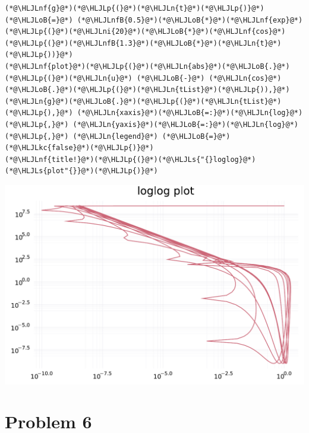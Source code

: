 \documentclass[12pt,a4paper]{article}
\newcommand{\HLJLkc}[1]{\textcolor[RGB]{59,151,46}{\textit{#1}}}
\newcommand{\HLJLn}[1]{#1}
\newcommand{\HLJLnf}[1]{\textcolor[RGB]{66,102,213}{#1}}
\newcommand{\HLJLs}[1]{\textcolor[RGB]{201,61,57}{#1}}
\newcommand{\HLJLnfB}[1]{\textcolor[RGB]{59,151,46}{#1}}
\newcommand{\HLJLni}[1]{\textcolor[RGB]{59,151,46}{#1}}
\newcommand{\HLJLoB}[1]{\textcolor[RGB]{102,102,102}{\textbf{#1}}}
\newcommand{\HLJLp}[1]{#1}
\begin{document}
\begin{lstlisting}
(*@\HLJLnf{g}@*)(*@\HLJLp{(}@*)(*@\HLJLn{t}@*)(*@\HLJLp{)}@*) (*@\HLJLoB{=}@*) (*@\HLJLnfB{0.5}@*)(*@\HLJLoB{*}@*)(*@\HLJLnf{exp}@*)(*@\HLJLp{(}@*)(*@\HLJLni{20}@*)(*@\HLJLoB{*}@*)(*@\HLJLnf{cos}@*)(*@\HLJLp{(}@*)(*@\HLJLnfB{1.3}@*)(*@\HLJLoB{*}@*)(*@\HLJLn{t}@*)(*@\HLJLp{))}@*)
(*@\HLJLnf{plot}@*)(*@\HLJLp{(}@*)(*@\HLJLn{abs}@*)(*@\HLJLoB{.}@*)(*@\HLJLp{(}@*)(*@\HLJLn{u}@*) (*@\HLJLoB{-}@*) (*@\HLJLn{cos}@*)(*@\HLJLoB{.}@*)(*@\HLJLp{(}@*)(*@\HLJLn{tList}@*)(*@\HLJLp{)),}@*) (*@\HLJLn{g}@*)(*@\HLJLoB{.}@*)(*@\HLJLp{(}@*)(*@\HLJLn{tList}@*)(*@\HLJLp{),}@*) (*@\HLJLn{xaxis}@*)(*@\HLJLoB{=:}@*)(*@\HLJLn{log}@*)(*@\HLJLp{,}@*) (*@\HLJLn{yaxis}@*)(*@\HLJLoB{=:}@*)(*@\HLJLn{log}@*)(*@\HLJLp{,}@*) (*@\HLJLn{legend}@*) (*@\HLJLoB{=}@*) (*@\HLJLkc{false}@*)(*@\HLJLp{)}@*) 
(*@\HLJLnf{title!}@*)(*@\HLJLp{(}@*)(*@\HLJLs{"{}loglog}@*) (*@\HLJLs{plot"{}}@*)(*@\HLJLp{)}@*)
\end{lstlisting}

\includegraphics[width=\linewidth]{figures/ass_3_report_8_1.pdf}

\section{Problem 6}
\end{document}
